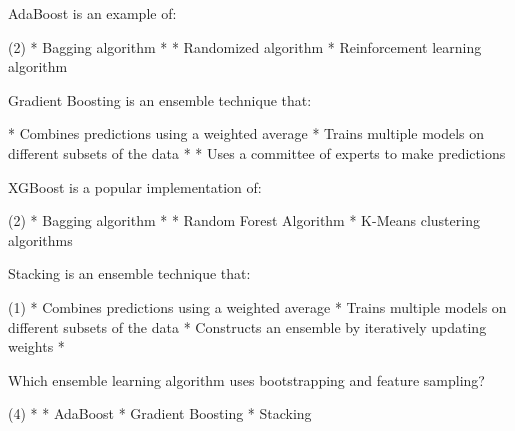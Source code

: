 \documentclass[10pt]{extarticle}
\begin{document}
\begin{exercise}
    AdaBoost is an example of:
    \begin{choice} (2)
        * Bagging algorithm
        * 
        * Randomized algorithm
        * Reinforcement learning algorithm
    \end{choice}
\end{exercise}
\begin{solution}
\end{solution}

\begin{exercise}
    Gradient Boosting is an ensemble technique that:
    \begin{choice}
        * Combines predictions using a weighted average
        * Trains multiple models on different subsets of the data
        * 
        * Uses a committee of experts to make predictions
    \end{choice}
\end{exercise}
\begin{solution}
\end{solution}

\begin{exercise}
    XGBoost is a popular implementation of:
    \begin{choice}(2)
        * Bagging algorithm
        * 
        * Random Forest Algorithm
        * K-Means clustering algorithms
    \end{choice}
\end{exercise}
\begin{solution}
\end{solution}

\begin{exercise}
    Stacking is an ensemble technique that:
    \begin{choice} (1)
        * Combines predictions using a weighted average
        * Trains multiple models on different subsets of the data
        * Constructs an ensemble by iteratively updating weights
        * 
    \end{choice}
\end{exercise}
\begin{solution}
\end{solution}

\begin{exercise}
    Which ensemble learning algorithm uses bootstrapping and feature sampling?
    \begin{choice} (4)
        * 
        * AdaBoost
        * Gradient Boosting
        * Stacking
    \end{choice}
\end{exercise}
\begin{solution}
\end{solution}
\end{document}
